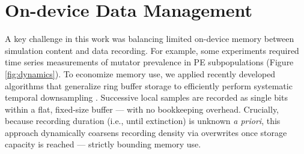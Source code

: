 

\section{On-device Data Management}
\label{sec:dynamics}



A key challenge in this work was balancing limited on-device memory between simulation content and data recording.
For example, some experiments required time series measurements of mutator prevalence in PE subpopulations (Figure \ref{fig:dynamics}).
To economize memory use, we applied recently developed algorithms that generalize ring buffer storage to efficiently perform systematic temporal downsampling \citep{moreno2024algorithms,gunther2014algorithm}.
Successive local samples are recorded as single bits within a flat, fixed-size buffer --- with no bookkeeping overhead.
Crucially, because recording duration (i.e., until extinction) is unknown \textit{a priori}, this approach dynamically coarsens recording density via overwrites once storage capacity is reached --- strictly bounding memory use.

